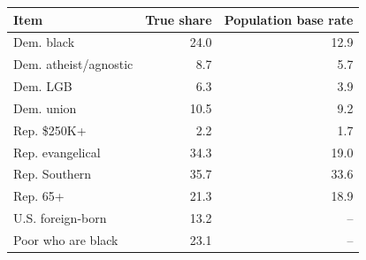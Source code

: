 
\begin{tabular}{lrr}
\toprule
Item & True share & Population base rate\\
\midrule
Dem. black & 24.0 & 12.9\\
Dem. atheist/agnostic & 8.7 & 5.7\\
Dem. LGB & 6.3 & 3.9\\
Dem. union & 10.5 & 9.2\\
Rep. \$250K+ & 2.2 & 1.7\\
Rep. evangelical & 34.3 & 19.0\\
Rep. Southern & 35.7 & 33.6\\
Rep. 65+ & 21.3 & 18.9\\
U.S. foreign-born & 13.2 & --\\
Poor who are black & 23.1 & --\\
\bottomrule
\end{tabular}
